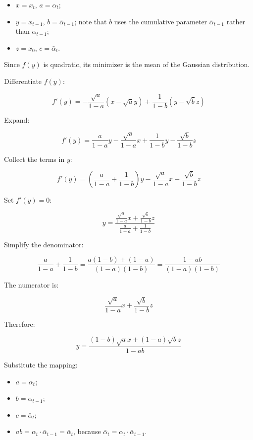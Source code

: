 \begin{itemize}
\tightlist
\item
  \(x=x_t\), \(a=\alpha_t\);
\item
  \(y=x_{t-1}\), \(b=\bar{\alpha}_{t-1}\); note that \(b\) uses the cumulative parameter \(\bar{\alpha}_{t-1}\) rather than \(\alpha_{t-1}\);
\item
  \(z=x_0\), \(c=\bar{\alpha}_t\).
\end{itemize}

Since \(f(y)\) is quadratic, its minimizer is the mean of the Gaussian distribution.

Differentiate \(f(y)\):

\[
f'(y)=-\frac{\sqrt{a}}{1-a}(x-\sqrt{a}y)+\frac{1}{1-b}(y-\sqrt{b}z)
\]

Expand:

\[
f'(y)=\frac{a}{1-a}y-\frac{\sqrt{a}}{1-a}x+\frac{1}{1-b}y-\frac{\sqrt{b}}{1-b}z
\]

Collect the terms in \(y\):

\[
f'(y)=\left(\frac{a}{1-a}+\frac{1}{1-b}\right)y-\frac{\sqrt{a}}{1-a}x-\frac{\sqrt{b}}{1-b}z
\]

Set \(f'(y)=0\):

\[
y=\frac{\frac{\sqrt{a}}{1-a}x+\frac{\sqrt{b}}{1-b}z}{\frac{a}{1-a}+\frac{1}{1-b}}
\]

Simplify the denominator:

\[
\frac{a}{1-a}+\frac{1}{1-b}
=\frac{a(1-b)+(1-a)}{(1-a)(1-b)}
=\frac{1-ab}{(1-a)(1-b)}
\]

The numerator is:

\[
\frac{\sqrt{a}}{1-a}x+\frac{\sqrt{b}}{1-b}z
\]

Therefore:

\[
y=\frac{(1-b)\sqrt{a}x+(1-a)\sqrt{b}z}{1-ab}
\]

Substitute the mapping:

\begin{itemize}
\tightlist
\item
  \(a=\alpha_t\);
\item
  \(b=\bar{\alpha}_{t-1}\);
\item
  \(c=\bar{\alpha}_t\);
\item
  \(ab=\alpha_t\cdot\bar{\alpha}_{t-1}=\bar{\alpha}_t\), because \(\bar{\alpha}_t=\alpha_t\cdot\bar{\alpha}_{t-1}\).
\end{itemize}

